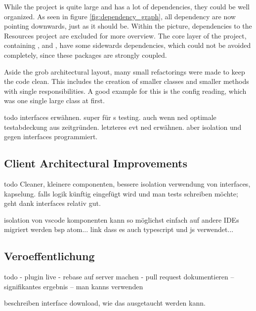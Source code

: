 While the project is quite large and has a lot of dependencies, they could be well organized.
As seen in figure \ref{fig:dependency_graph}, all dependency are now pointing downwards, just as it should be.
Within the picture, dependencies to the Resources project are excluded for more overview.
The core layer of the project, containing ,  and , have some sidewards dependencies, which could not be avoided completely, since these packages are strongly coupled.

Aside the grob architectural layout, many small refactorings were made to keep the code clean.
This includes the creation of smaller classes and smaller methods with single responsibilities.
A good example for this is the config reading, which was one single large class at first. 

todo interfaces erwähnen. super für s testing. auch wenn ned optimale testabdeckung aus zeitgründen. letzteres evt ned erwähnen.
aber isolation und gegen interfaces programmiert. 

\subsection{Client Architectural Improvements}
todo
Cleaner, kleinere componenten, bessere isolation
verwendung von interfaces, kapselung. falls logik künftig eingefügt wird und man tests schreiben möchte; geht dank interfaces relativ gut.

isolation von vscode komponenten
kann so möglichst einfach auf andere IDEs migriert werden
bsp atom... link dass es auch typescript und js verwendet...

\subsection{Veroeffentlichung}
todo
- plugin live
- rebase auf server machen
- pull request dokumentieren -- signifikantes ergebnis -- man kanns verwenden

beschreiben interface download, wie das ausgetaucht werden kann.
